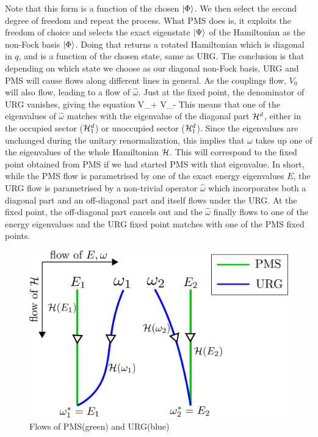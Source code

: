 \documentclass[12pt,twoside]{article}
\numberwithin{equation}{section}
\begin{document}
Note that this form is a function of the chosen \(\ket{\Phi}\).
We then select the second degree of freedom and repeat the process.
What PMS does is, it exploits the freedom of choice and selects the exact eigenstate \(\ket{\Psi}\) of the Hamiltonian as the non-Fock basis \(\ket{\Phi}\).
Doing that returns a rotated Hamiltonian which is diagonal in \(q\), and is a function of the chosen state, same as URG. The conclusion is that depending on which state we choose as our diagonal non-Fock basis, URG and PMS will cause flows along different lines in general.
\pb As the couplings flow, \(V_0\) will also flow, leading to a flow of \(\hat\omega\). Just at the fixed point, the denominator of URG vanishes, giving the equation
\beq
{}V_+  V_-
\eeq
This means that one of the eigenvalues of \(\hat\omega\) matches with the eigenvalue of the diagonal part \(\mathcal{H}^d\), either in the occupied sector (\(\mathcal{H}^d_1\)) or unoccupied sector (\(\mathcal{H}^d_1\)). Since the eigenvalues are unchanged during the unitary renormalization, this implies that \(\omega\) takes up one of the eigenvalues of the whole Hamiltonian \(\mathcal{H}\). This will correspond to the fixed point obtained from PMS if we had started PMS with that eigenvalue.
\pb In short, while the PMS flow is parametrised by one of the exact energy eigenvalues \(E\), the URG flow is parametrised by a non-trivial operator \(\hat \omega\) which incorporates both a diagonal part and an off-diagonal part and itself flows under the URG. At the fixed point, the off-diagonal part cancels out and the \(\hat\omega\) finally flows to one of the energy eigenvalues and the URG fixed point matches with one of the PMS fixed points.
\begin{figure}
\centering
\includegraphics[scale=0.42]{pms_vs_urg.png}
\caption{Flows of PMS(green) and URG(blue)}
\end{figure}
\end{document}
